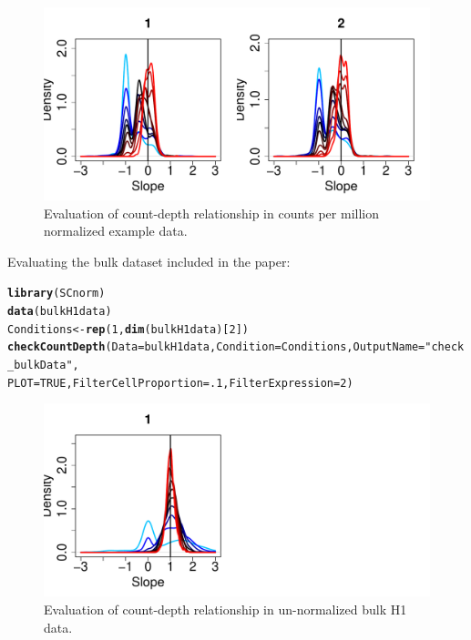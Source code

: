 \documentclass{article}\usepackage[]{graphicx}\usepackage[usenames,dvipsnames]{color}
\makeatletter
\newcommand{\hlnum}[1]{\textcolor[rgb]{0.686,0.059,0.569}{#1}}%
\newcommand{\hlstr}[1]{\textcolor[rgb]{0.192,0.494,0.8}{#1}}%
\newcommand{\hlstd}[1]{\textcolor[rgb]{0.345,0.345,0.345}{#1}}%
\newcommand{\hlkwb}[1]{\textcolor[rgb]{0.69,0.353,0.396}{#1}}%
\newcommand{\hlkwc}[1]{\textcolor[rgb]{0.333,0.667,0.333}{#1}}%
\newcommand{\hlkwd}[1]{\textcolor[rgb]{0.737,0.353,0.396}{\textbf{#1}}}%
\newenvironment{kframe}{%
 \def\at@end@of@kframe{}%
 \ifinner\ifhmode%
  \def\at@end@of@kframe{\end{minipage}}%
  \begin{minipage}{\columnwidth}%
 \fi\fi%
 \def\FrameCommand##1{\hskip\@totalleftmargin \hskip-\fboxsep
 \colorbox{shadecolor}{##1}\hskip-\fboxsep
     \hskip-\linewidth \hskip-\@totalleftmargin \hskip\columnwidth}%
 \MakeFramed {\advance\hsize-\width
   \@totalleftmargin\z@ \linewidth\hsize
   \@setminipage}}%
 {\par\unskip\endMakeFramed%
 \at@end@of@kframe}
\newenvironment{knitrout}{}{} %
\makeatother
\begin{document}
\begin{figure}[h!]
\centering
\includegraphics[width=.7\textwidth]{check_exampleDataNorm_count-depth_evaluation}
\caption{Evaluation of count-depth relationship in counts per million normalized example data.}
\end{figure}


\newpage
Evaluating the bulk dataset included in the paper:
\begin{knitrout}
\color{fgcolor}\begin{kframe}
\begin{alltt}
\hlkwd{library}\hlstd{(SCnorm)}
\hlkwd{data}\hlstd{(bulkH1data)}
\hlstd{Conditions} \hlkwb{<-} \hlkwd{rep}\hlstd{(}\hlnum{1}\hlstd{,} \hlkwd{dim}\hlstd{(bulkH1data)[}\hlnum{2}\hlstd{])}
\hlkwd{checkCountDepth}\hlstd{(}\hlkwc{Data} \hlstd{= bulkH1data,} \hlkwc{Condition} \hlstd{= Conditions,} \hlkwc{OutputName} \hlstd{=} \hlstr{"check_bulkData"}\hlstd{,}
                \hlkwc{PLOT}\hlstd{=}\hlnum{TRUE}\hlstd{,} \hlkwc{FilterCellProportion} \hlstd{=} \hlnum{.1}\hlstd{,} \hlkwc{FilterExpression} \hlstd{=} \hlnum{2}\hlstd{)}
\end{alltt}
\end{kframe}
\end{knitrout}

\begin{figure}[h!]
\centering
\includegraphics[width=.7\textwidth]{check_bulkData_initial_evaluation}
\caption{Evaluation of count-depth relationship in un-normalized bulk H1 data.}
\end{figure}
\end{document}
